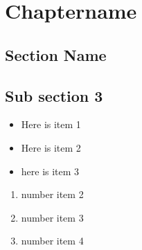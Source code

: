 \chapter{Chaptername}

\section{Section Name}

\section{Sub section 3}


\begin{itemize}
\item Here is item 1
\item Here is item 2
\item here is item 3
\end{itemize}


\begin{enumerate}
\item number item 2
\item number item 3
\item number item 4
\end{enumerate}

